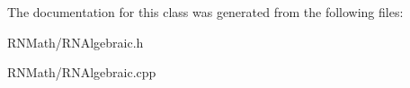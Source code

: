 The documentation for this class was generated from the following files\+:\begin{DoxyCompactItemize}
\item 
R\+N\+Math/R\+N\+Algebraic.\+h\item 
R\+N\+Math/R\+N\+Algebraic.\+cpp\end{DoxyCompactItemize}
